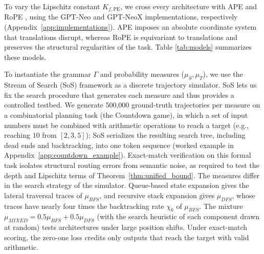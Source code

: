 \documentclass{article}
\begin{document}
To vary the Lipschitz constant $K_{f, \mathrm{PE}}$, we cross every architecture with APE and RoPE \citep{su2023roformerenhancedtransformerrotary}, using the GPT-Neo and GPT-NeoX implementations, respectively (Appendix~\ref{app:implementations}). APE imposes an absolute coordinate system that translations disrupt, whereas RoPE is equivariant to translations and preserves the structural regularities of the task. Table \ref{tab:models} summarizes these models.

To instantiate the grammar $\Gamma$ and probability measures ($\mu_S, \mu_T$), we use the Stream of Search (SoS) framework \citep{gandhi2024streamsearchsoslearning} as a discrete trajectory simulator. SoS lets us fix the search procedure that generates each measure and thus provides a controlled testbed.
We generate 500,000 ground-truth trajectories per measure on a combinatorial planning task (the Countdown game), in which a set of input numbers must be combined with arithmetic operations to reach a target (e.g., reaching $10$ from $[2,3,5]$); SoS serializes the resulting search tree, including dead ends and backtracking, into one token sequence (worked example in Appendix~\ref{app:countdown_example}). Exact-match verification on this formal task isolates structural routing errors from semantic noise, as required to test the depth and Lipschitz terms of Theorem~\ref{thm:unified_bound}. %
The measures differ in the search strategy of the simulator. Queue-based state expansion gives the lateral traversal traces of $\mu_{BFS}$, and recursive stack expansion gives $\mu_{DFS}$, whose traces have nearly four times the backtracking rate $\chi_6$ of $\mu_{BFS}$. The mixture $\mu_{MIXED} = 0.5 \mu_{BFS} + 0.5 \mu_{DFS}$ (with the search heuristic of each component drawn at random) tests architectures under large position shifts. Under exact-match scoring, the zero-one loss credits only outputs that reach the target with valid arithmetic. 
\end{document}

